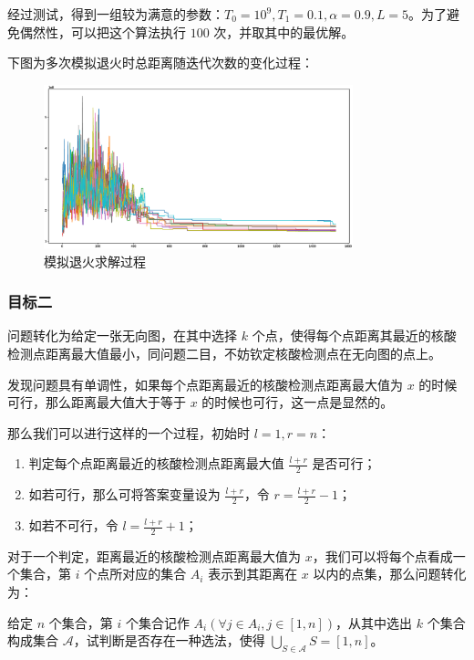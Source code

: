 \documentclass{cumcmthesis}
\begin{document}
经过测试，得到一组较为满意的参数：$T_0=10^9,T_1=0.1,\alpha=0.9,L=5$。为了避免偶然性，可以把这个算法执行 $100$ 次，并取其中的最优解。

下图为多次模拟退火时总距离随迭代次数的变化过程：

\begin{figure}[H]
	\centering
	\includegraphics[width=0.80\textwidth]{images/SA.eps}
	\caption{模拟退火求解过程}
	\label{fig:P3T1-SA}
\end{figure}

\subsubsection{目标二}

问题转化为给定一张无向图，在其中选择 $k$ 个点，使得每个点距离其最近的核酸检测点距离最大值最小，同问题二目，不妨钦定核酸检测点在无向图的点上。

发现问题具有单调性，如果每个点距离最近的核酸检测点距离最大值为 $x$ 的时候可行，那么距离最大值大于等于 $x$ 的时候也可行，这一点是显然的。

那么我们可以进行这样的一个过程，初始时 $l=1,r=n$：

\begin{enumerate}
    \item 判定每个点距离最近的核酸检测点距离最大值 $\frac{l+r}{2}$ 是否可行；
    \item 如若可行，那么可将答案变量设为 $\frac{l+r}{2}$，令 $r = \frac{l+r}{2}-1$；
    \item 如若不可行，令 $l = \frac{l+r}{2} + 1$；
\end{enumerate}

对于一个判定，距离最近的核酸检测点距离最大值为 $x$，我们可以将每个点看成一个集合，第 $i$ 个点所对应的集合 $A_i$ 表示到其距离在 $x$ 以内的点集，那么问题转化为：

给定 $n$ 个集合，第 $i$ 个集合记作 $A_i(\forall j \in A_i, j 
\in [1,n])$，从其中选出 $k$ 个集合构成集合 $\mathscr{A}$，试判断是否存在一种选法，使得 $\bigcup\limits_{S \in \mathscr{A}} S = [1,n]$。
\end{document}
